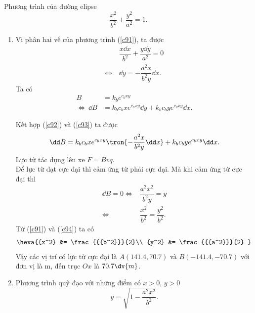     \begin{loigiai}
    Phương trình của đường elipse
    \[ \dfrac{x^2}{b^2}+\dfrac{y^2}{a^2}=1. \tag{1} \label{c91}\]
    \begin{enumerate}[1)]
        \setlength{\itemsep}{0pt}
        \item Vi phân hai vế của phương trình (\ref{c91}), ta được
        \[\begin{aligned}
                 &\dfrac{x\dd x}{b^2}+\dfrac{y\dd y}{a^2}=0\\
                 \Leftrightarrow  \ &\dd y=-\dfrac{a^2x}{b^2y}\dd x.
                \end{aligned}\tag{2} \label{c92}\]
        Ta có  
        \[\begin{aligned}
             B&=k_be^{c_bxy}\\
             \Leftrightarrow\  \dd B&=k_bc_bxe^{c_bxy}\dd y+k_bc_bye^{c_bxy}\dd x.
            \end{aligned}\tag{3} \label{c93} \]
        
        Kết hợp (\ref{c92}) và (\ref{c93}) ta được
        $$\dd B=k_bc_bxe^{c_bxy}\tron{-\dfrac{a^2x}{b^2y}\dd x}+k_bc_bye^{c_bxy}\dd x.$$
        Lực từ tác dụng lên xe 
        $F=Bvq$.\\
        Để lực từ đạt cực đại thì cảm ứng từ phải cực đại. Mà khi cảm ứng từ cực đại thì 
        \[\begin{aligned}
             \dd B=0\Leftrightarrow&\dfrac{a^2x^2}{b^2y}=y\\
             \Leftrightarrow& \dfrac{x^2}{b^2}=\dfrac{y^2}{b^2}. 
            \end{aligned}\tag{4}\label{c94}\]
        Từ (\ref{c91}) và (\ref{c94}) ta có
        \[\heva{{x^2} &= \frac{{{b^2}}}{2}\\  {y^2} &= \frac{{{a^2}}}{2} }\]
        Vậy các vị trí có lực từ cực đại là $A(141.4,70.7)$ và $B(-141.4,-70.7)$ với đơn vị là $\mathrm{m}$, đến trục $Ox$ là $70.7\dv{m}$.
        \item Phương trình quỹ đạo với những điểm có $x>0$, $y>0$
        $$y=\sqrt{1-\dfrac{a^2x^2}{b^2}}.$$
        \begin{center}
            
        {

\begin{tikzpicture}[x=0.75pt,y=0.75pt,yscale=-1,xscale=1]


\end{tikzpicture}}
\end{center}
\end{enumerate}
\end{loigiai}
